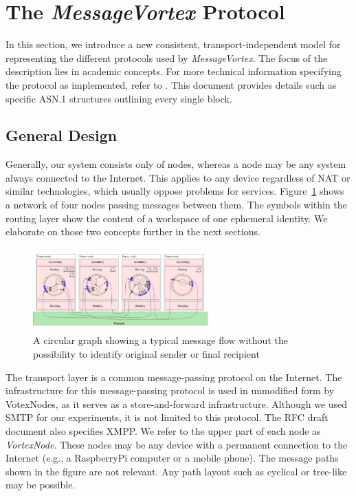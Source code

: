 \documentclass[acmsmall, screen]{acmart}
\begin{document}

\section{The \emph{MessageVortex} Protocol\label{sec:protocol}}
 In this section, we introduce a new consistent, transport-independent model for representing the different protocols used by \emph{MessageVortex}. The focus of the description lies in academic concepts. For more technical information specifying the protocol as implemented, refer to \cite{MessageVortexRFC}. This document provides details such as specific ASN.1 structures outlining every single block.

\subsection{General Design}
Generally, our system consists only of nodes, whereas a node may be any system always connected to the Internet. This applies to any device regardless of NAT or similar technologies, which usually oppose problems for services. Figure~\ref{fig:protocolLayers} shows a network of four nodes passing messages between them. The symbols within the routing layer show the content of a workspace of one ephemeral identity. We elaborate on those two concepts further in the next sections. 

\begin{figure}[ht]
	\centering\includegraphics[width=0.6\textwidth,height=90pt]{roughProtocolDesign}
	\caption{A circular graph showing a typical message flow without the possibility to identify original sender or final recipient}
	\label{fig:protocolLayers}
\end{figure}

The transport layer is a common message-passing protocol on the Internet. The infrastructure for this message-passing protocol is used in unmodified form by VotexNodes, as it serves as a store-and-forward infrastructure. Although we used SMTP for our experiments, it is not limited to this protocol. The RFC draft document also specifies XMPP. We refer to the upper part of each node as \emph{VortexNode}. These nodes may be any device with a permanent connection to the Internet (e.g., a RaspberryPi computer or a mobile phone). The message paths shown in the figure are not relevant. Any path layout such as cyclical or tree-like may be possible.
\end{document}
